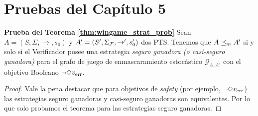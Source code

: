 \section{Pruebas del Capítulo 5}

\noindent
\textbf{Prueba del Teorema \ref{thm:wingame_strat_prob}}
  Sean $A= ( S, \Sigma, {\rightarrow}, s_0 )$ y $A'=( S', \Sigma_{\mathcal{F}}, {\rightarrow'}, s_0' )$ dos PTS.
  Tenemos que $A \preceq_{m} A'$ si y solo si el Verificador posee una estrategia \textit{seguro ganadora (o casi-seguro ganadora)} para el grafo de juego de enmascaramiento estocástico
  $\mathcal{G}_{A,A'}$ con el objetivo Booleano $\neg \Diamond v_{\text{err}}$.
\noindent \\

\begin{proof} 
 Vale la pena destacar que para objetivos de \emph{safety} (por ejemplo, $\neg \Diamond v_{\text{err}}$) las estrategias seguro ganadoras y casi-seguro ganadoras son equivalentes. Por lo que solo probamos el teorema para las estrategias seguro ganadoras.
  

\end{proof}

